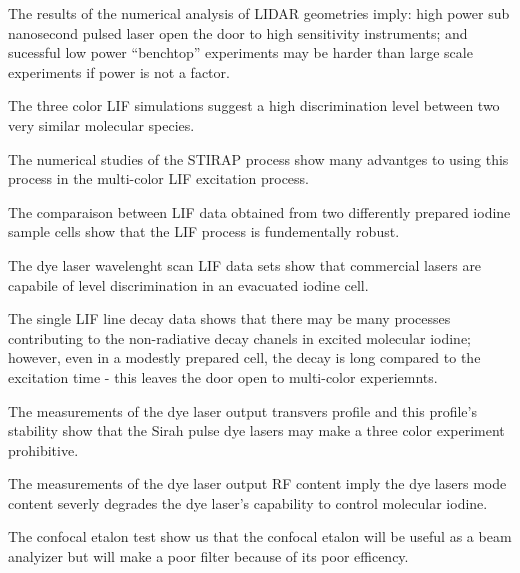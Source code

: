 The results of the numerical analysis of LIDAR geometries imply: high power sub nanosecond pulsed laser open the door to high sensitivity instruments; and sucessful low power ``benchtop'' experiments may be harder than large scale experiments if power is not a factor.

The three color LIF simulations suggest a high discrimination level between two very similar molecular species.

The numerical studies of the STIRAP process show many advantges to using this process in the multi-color LIF excitation process.

The comparaison between LIF data obtained from two differently prepared iodine sample cells show that the LIF process is fundementally robust.

The dye laser wavelenght scan LIF data sets show that commercial lasers are capabile of level discrimination in an evacuated iodine cell.

The single LIF line decay data shows that there may be many processes contributing to the non-radiative decay chanels in excited molecular iodine; however, even in a modestly prepared cell, the decay is long compared to the excitation time - this leaves the door open to multi-color experiemnts.

The measurements of the dye laser output transvers profile and this profile's stability show that the Sirah pulse dye lasers may make a three color experiment prohibitive.

The measurements of the dye laser output RF content imply the dye lasers mode content severly degrades the dye laser's capability to control molecular iodine.

The confocal etalon test show us that the confocal etalon will be useful as a beam analyizer but will make a poor filter because of its poor efficency.

